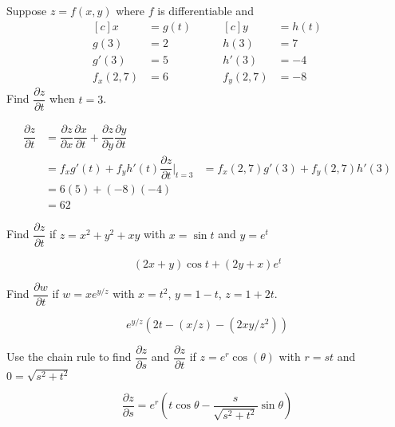 \documentclass[12pt]{exam}
\newcommand{\pd}[2]{\dfrac{\partial #1}{\partial #2}}
\begin{document}
\begin{questions}

\question Suppose \(z=f(x,y)\) where \(f\) is differentiable and
    \begin{equation*}
        \begin{aligned}[c]
            x&=g(t)\\
            g(3)&=2\\
            g'(3)&=5\\
            f_x(2,7)&=6
        \end{aligned}
        \qquad
        \begin{aligned}[c]
            y&=h(t)\\
            h(3)&=7\\
            h'(3)&=-4\\
            f_y(2,7)&=-8
        \end{aligned}
    \end{equation*}
    Find \(\pd{z}{t}\) when \(t=3\).
    \ifprintanswers
        \begin{solution}
            \begin{align*}
                \pd{z}{t} & = \pd{z}{x}\pd{x}{t}+\pd{z}{y}\pd{y}{t}\\
                & = f_{x}g'(t)+f_yh'(t)
                \pd{z}{t}|_{t=3} & = f_{x}(2,7)g'(3)+f_{y}(2,7)h'(3) \\
                    & = 6(5)+(-8)(-4)\\
                    & = 62
            \end{align*}
        \end{solution}
    \else
        \vfill
    \fi

\question Find \(\pd{z}{t}\) if \(z=x^2+y^2+xy\) with \(x=\sin t\) and \(y=e^t\)
    \ifprintanswers
        \begin{solution}

        \[
            (2x+y)\cos t+(2y+x)e^t
        \]
        \end{solution}
    \else
        \vfill
        \newpage
    \fi 
\question Find \(\pd{w}{t}\) if \(w=xe^{y/z}\) with 
\(x=t^2\), \(y=1-t\), \(z=1+2t\).
    \ifprintanswers
        \begin{solution}
            \[
                e^{y/z}\left(2t-(x/z)-(2xy/z^2)\right)
            \]
        \end{solution}
    \else
        \vfill
    \fi

\question Use the chain rule to find 
\(\pd{z}{s}\) and \(\pd{z}{t}\) if \(z=e^r\cos(\theta)\) with \(r=st\) and \(0=\sqrt{s^2+t^2}\)
    \ifprintanswers
        \begin{solution}
            \[
                \pd{z}{s} = e^r\left(t\cos\theta -\dfrac{s}{\sqrt{s^2+t^2}}\sin\theta\right)
            \]
        \end{solution}
    \else
        \vfill
    \fi


\end{questions}
\end{document}
